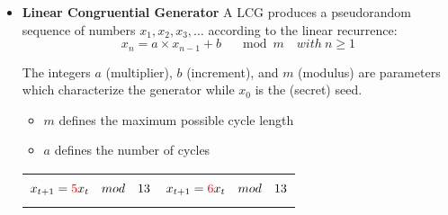 \begin{itemize}
    \item \textbf{Linear Congruential Generator} A LCG produces a pseudorandom sequence
        of numbers $x_1,x_2,x_3,\ldots$ according to the linear recurrence:
        $$ x_n = a\times x_{n-1} + b \quad \mod{m}\quad with\ n \geq 1 $$

        The integers $a$ (multiplier), $b$ (increment), and $m$ (modulus) are parameters
        which characterize the generator while $x_0$ is the (secret) seed.

        \begin{itemize}
            \item $m$ defines the maximum possible cycle
                length
            \item $a$ defines the number of cycles 
        \end{itemize}

        \begin{tabular}{m{8cm}m{6cm}}
            $$x_{t+1} = \textcolor{red}{5} x_t \quad mod\quad 13$$
            &
            $$x_{t+1} = \textcolor{red}{6} x_t \quad mod\quad 13$$
            \\


\end{tabular}
\end{itemize}
